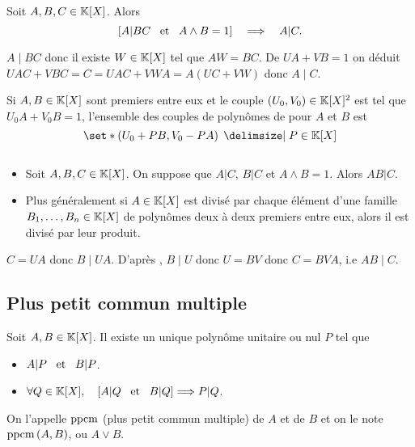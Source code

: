 \documentclass{magnolia}
\begin{document}
\begin{proposition}[nom={Lemme de \nom{Gauss}}]
Soit $A,B,C\in\polyK$. Alors
\[\left[A|BC \quad\!\text{et}\quad\! A\wedge B=1\right]\quad\Longrightarrow\quad A|C.\]  
\end{proposition}

\begin{preuve}
$A\mid BC$ donc il existe $W \in \polyK$ tel que $AW=BC$. De $UA+VB=1$ on déduit $UAC+VBC=C=UAC+VWA=A(UC+VW)$ donc $A\mid C$.
\end{preuve}


\begin{remarqueUnique}
\exo Si $A,B\in\polyK$ sont premiers entre eux et le couple
  $\p{U_0,V_0}\in\polyK^2$ est tel que $U_0A+V_0B=1$, l'ensemble des couples de
  polynômes de  pour $A$ et $B$ est
  \[\enstq{\p{U_0+PB,V_0-PA}}{P\in\polyK}\]
\end{remarqueUnique}

\begin{proposition}
$\quad$
\begin{itemize}
\item Soit $A,B,C\in\polyK$. On suppose que $A|C$, $B|C$ et $A\wedge B=1$.
  Alors $AB|C$.
\item Plus généralement si $A\in\polyK$ est divisé par chaque élément d'une
  famille $B_1,\ldots,B_n\in\polyK$ de polynômes deux à deux premiers entre eux,
  alors il est divisé par leur produit.
\end{itemize}
\end{proposition}

\begin{preuve}
$C=UA$ donc $B\mid UA$. D'après , $B\mid U$ donc $U=BV$ donc $C=BVA$, i.e $AB\mid C$.
\end{preuve}
\subsection{Plus petit commun multiple}

\begin{definition}
Soit $A,B\in\polyK$. Il existe un unique polynôme unitaire ou nul $P$ tel que
\begin{itemize}
\item $A|P \quad\!\text{et}\quad\! B|P$.
\item $\forall Q\in\polyK \qsep \cro{A|Q \et B|Q} \implique P|Q$.
\end{itemize}
On l'appelle $\operatorname{ppcm}$ (plus petit commun multiple) de $A$ et de $B$ et on le note
$\operatorname{ppcm}\left(A,B\right)$, ou $A\vee B$.
\end{definition}
\end{document}
